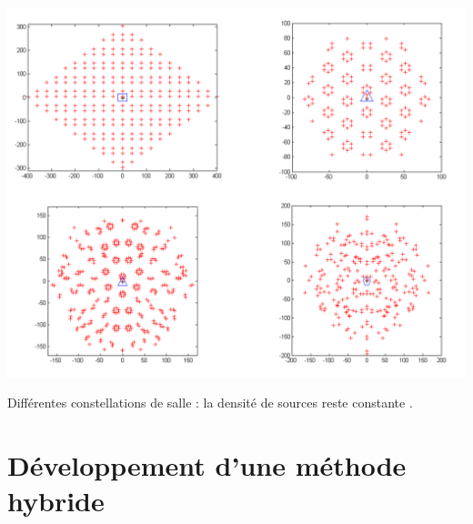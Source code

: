 \begin{figureth}
	\includegraphics[width=\linewidth]{images/constellations}
	\caption[Différentes constellations de salle : la densité de sources reste constante.]{Différentes constellations de salle : la densité de sources reste constante \footnotemark.}
	\label{constellations}
\end{figureth}


		
		
		
		
		
		
		
		
		
		
		
		
		
\chapter{Développement d'une méthode hybride}
	\minitoc
	\newpage
	
